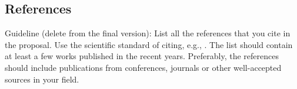 \documentclass[a4paper, 12pt]{article}
\newcommand\cmnt[1]{\textcolor{munsell}{#1}}
\begin{document}
\subsection{References}
\label{literatura}

\cmnt{
Guideline (delete from the final version):
List all the references that you cite in the proposal. Use the scientific standard of citing, e.g.,
\cite{Zivkovic2004}. The list should contain at least a few works published in the recent years. Preferably, the references should include publications from conferences, journals or other well-accepted sources in your field.
}

\renewcommand\refname{}
\vspace{-50px}






%
\end{document}
